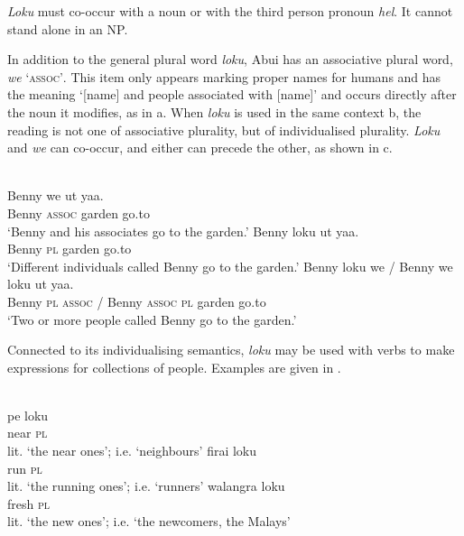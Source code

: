 \textit{Loku} must co-occur with a noun or with the third person pronoun \textit{hel}. It cannot stand alone in an NP.

In addition to the general plural word \textit{loku}, Abui has an associative plural word, \textit{we} `\textsc{assoc'}. This item only appears marking proper names for humans and has the meaning `[name] and people associated with [name]' and occurs directly after the noun it modifies, as in a. When \textit{loku} is used in the same context b, the reading is not one of associative plurality, but of individualised plurality. \textit{Loku} and \textit{we} can co-occur, and either can precede the other, as shown in c.




\ea%
\label{ex:9:53}
\ea
{} \\
\gll Benny w{e} ut yaa. \\
   Benny \textsc{assoc} garden go.to  \\
\glt `Benny and his associates go to the garden.'
\ex
\gll Benny loku ut yaa. \\
   Benny \textsc{pl} garden go.to  \\
\glt `Different individuals called Benny go to the garden.'
\ex
\gll Benny loku we / Benny  we loku ut yaa.\\
    Benny \textsc{pl}  \textsc{assoc} / Benny \textsc{assoc} \textsc{pl} garden go.to\\
\glt  `Two or more people called Benny go to the garden.'
\z
\z






Connected to its individualising semantics, \textit{loku} may be used with verbs to make expressions for collections of people. Examples are given in .


\ea%
\label{ex:9:54}
\ea
{} \\
\gll pe loku  \\
   near \textsc{pl}  \\
\glt lit. `the near ones'; i.e. `neighbours'
\ex
\gll firai loku \\
  run \textsc{pl}   \\
 \glt lit. `the running ones'; i.e. `runners'
\glt
\ex
\gll walangra loku \\
   fresh \textsc{pl}  \\
\glt  lit. `the new ones'; i.e. `the newcomers, the Malays'
\z
\z






